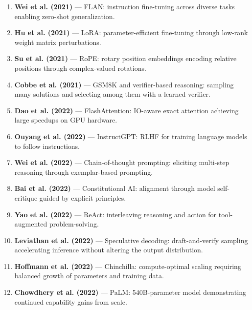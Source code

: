 \begin{enumerate}
\item \textbf{Wei et al. (2021)} --- FLAN: instruction fine-tuning across diverse tasks enabling zero-shot generalization.

\item \textbf{Hu et al. (2021)} --- LoRA: parameter-efficient fine-tuning through low-rank weight matrix perturbations.

\item \textbf{Su et al. (2021)} --- RoPE: rotary position embeddings encoding relative positions through complex-valued rotations.

\item \textbf{Cobbe et al. (2021)} --- GSM8K and verifier-based reasoning: sampling many solutions and selecting among them with a learned verifier.

\item \textbf{Dao et al. (2022)} --- FlashAttention: IO-aware exact attention achieving large speedups on GPU hardware.

\item \textbf{Ouyang et al. (2022)} --- InstructGPT: RLHF for training language models to follow instructions.

\item \textbf{Wei et al. (2022)} --- Chain-of-thought prompting: eliciting multi-step reasoning through exemplar-based prompting.

\item \textbf{Bai et al. (2022)} --- Constitutional AI: alignment through model self-critique guided by explicit principles.

\item \textbf{Yao et al. (2022)} --- ReAct: interleaving reasoning and action for tool-augmented problem-solving.

\item \textbf{Leviathan et al. (2022)} --- Speculative decoding: draft-and-verify sampling accelerating inference without altering the output distribution.

\item \textbf{Hoffmann et al. (2022)} --- Chinchilla: compute-optimal scaling requiring balanced growth of parameters and training data.

\item \textbf{Chowdhery et al. (2022)} --- PaLM: 540B-parameter model demonstrating continued capability gains from scale.
\end{enumerate}
